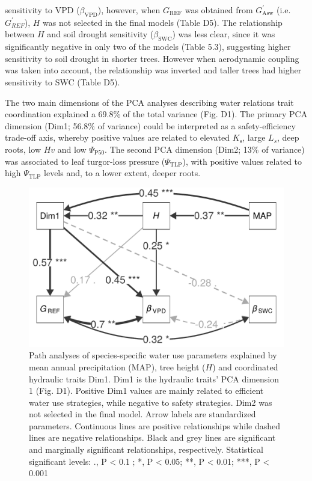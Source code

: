 \documentclass[11pt,twoside]{reedthesis}
\begin{document}
sensitivity to VPD (\(\beta_{\text{VPD}}\)), however, when
\(G_{\text{REF}}\) was obtained from \(G_{\text{Asw}}^{'}\) (i.e.
\(G_{REF}^{'}\)), \(H\) was not selected in the final models (Table D5).
The relationship between \(H\) and soil drought sensitivity
(\(\beta_{\text{SWC}}\)) was less clear, since it was significantly
negative in only two of the models (Table 5.3), suggesting higher
sensitivity to soil drought in shorter trees. However when aerodynamic
coupling was taken into account, the relationship was inverted and
taller trees had higher sensitivity to SWC (Table D5).\par

The two main dimensions of the PCA analyses describing water relations
trait coordination explained a 69.8\% of the total variance (Fig. D1).
The primary PCA dimension (Dim1; 56.8\% of variance) could be
interpreted as a safety-efficiency trade-off axis, whereby positive
values are related to elevated \(K_\text{s}\), large \(L_s\), deep
roots, low \(Hv\) and low \textbar{}\(\Psi_{\text{P50}}\)\textbar{}. The
second PCA dimension (Dim2; 13\% of variance) was associated to leaf
turgor-loss pressure (\(\Psi_{\text{TLP}}\)), with positive values
related to high \textbar{}\(\Psi_{\text{TLP}}\)\textbar{} levels and, to
a lower extent, deeper roots.\par
\begin{figure}[hbt!]

{\centering \includegraphics[width=0.8\linewidth]{figure/CH5/Figure_6} 

}

\caption[Path analyses of species-specific water use parameters.]{Path analyses of species-specific water use parameters explained by mean annual precipitation (MAP), tree height ($H$) and coordinated hydraulic traits Dim1. Dim1 is the hydraulic traits’ PCA dimension 1 (Fig. D1). Positive Dim1 values are mainly related to efficient water use strategies, while negative to safety strategies. Dim2 was not selected in the final model. Arrow labels are standardized parameters. Continuous lines are positive relationships while dashed lines are negative relationships. Black and grey lines are significant and marginally significant relationships, respectively. Statistical significant levels: ., P < 0.1 ; *, P < 0.05; **, P < 0.01; ***, P < 0.001}\label{fig:ch5fig6}
\end{figure}
\end{document}
